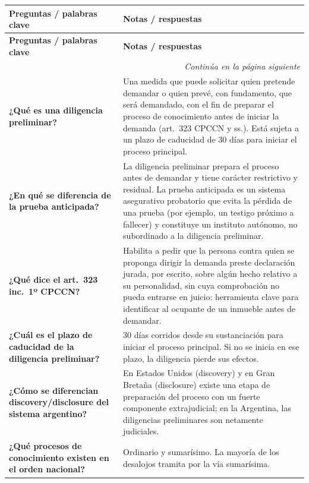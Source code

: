 \documentclass[12pt,oneside]{book}
\begin{document}
\begin{longtable}{p{} p{}}
\toprule
\textbf{Preguntas / palabras clave} & \textbf{Notas / respuestas} \\
\midrule
\endfirsthead
\toprule
\textbf{Preguntas / palabras clave} & \textbf{Notas / respuestas} \\
\midrule
\endhead
\midrule
\multicolumn{2}{r}{\textit{Continúa en la página siguiente}} \\
\endfoot
\bottomrule
\endlastfoot

\textbf{¿Qué es una diligencia preliminar?} &
Una medida que puede solicitar quien pretende demandar o quien prevé, con fundamento, que será demandado, con el fin de preparar el proceso de conocimiento antes de iniciar la demanda (art.\ 323 CPCCN y ss.). Está sujeta a un plazo de caducidad de 30 días para iniciar el proceso principal. \\

\textbf{¿En qué se diferencia de la prueba anticipada?} &
La diligencia preliminar prepara el proceso antes de demandar y tiene carácter restrictivo y residual. La prueba anticipada es un sistema asegurativo probatorio que evita la pérdida de una prueba (por ejemplo, un testigo próximo a fallecer) y constituye un instituto autónomo, no subordinado a la diligencia preliminar. \\

\textbf{¿Qué dice el art.\ 323 inc.\ 1º CPCCN?} &
Habilita a pedir que la persona contra quien se proponga dirigir la demanda preste declaración jurada, por escrito, sobre algún hecho relativo a su personalidad, sin cuya comprobación no pueda entrarse en juicio: herramienta clave para identificar al ocupante de un inmueble antes de demandar. \\

\textbf{¿Cuál es el plazo de caducidad de la diligencia preliminar?} &
30 días corridos desde su sustanciación para iniciar el proceso principal. Si no se inicia en ese plazo, la diligencia pierde sus efectos. \\

\textbf{¿Cómo se diferencian discovery/disclosure del sistema argentino?} &
En Estados Unidos (discovery) y en Gran Bretaña (disclosure) existe una etapa de preparación del proceso con un fuerte componente extrajudicial; en la Argentina, las diligencias preliminares son netamente judiciales. \\

\textbf{¿Qué procesos de conocimiento existen en el orden nacional?} &
Ordinario y sumarísimo. La mayoría de los desalojos tramita por la vía sumarísima. \\


\end{longtable}
\end{document}
